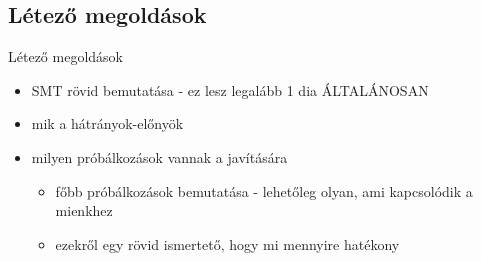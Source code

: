 \subsection{Létező megoldások}

\begin{frame}{Létező megoldások}
	
	\begin{itemize}
		\item
			SMT rövid bemutatása - ez lesz legalább 1 dia ÁLTALÁNOSAN
		\item
			mik a hátrányok-előnyök
		\item
			milyen próbálkozások vannak a javítására
		\begin{itemize}
			\item
				főbb próbálkozások bemutatása - lehetőleg olyan, ami kapcsolódik a mienkhez
			\item
				ezekről egy rövid ismertető, hogy mi mennyire hatékony
		\end{itemize}
	\end{itemize}
	
\end{frame}


